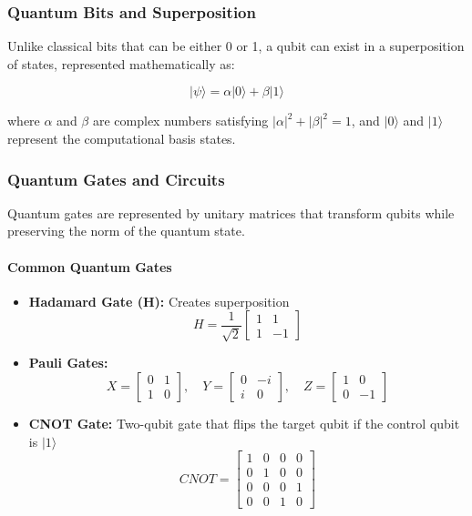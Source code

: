 \documentclass{article}
\begin{document}
\subsubsection{Quantum Bits and Superposition}
Unlike classical bits that can be either 0 or 1, a qubit can exist in a superposition of states, represented mathematically as:

\[ |\psi\rangle = \alpha|0\rangle + \beta|1\rangle \]

where $\alpha$ and $\beta$ are complex numbers satisfying $|\alpha|^2 + |\beta|^2 = 1$, and $|0\rangle$ and $|1\rangle$ represent the computational basis states.

\subsubsection{Quantum Gates and Circuits}
Quantum gates are represented by unitary matrices that transform qubits while preserving the norm of the quantum state.

\paragraph{Common Quantum Gates}
\begin{itemize}
    \item \textbf{Hadamard Gate (H):} Creates superposition
    \[ H = \frac{1}{\sqrt{2}}\begin{bmatrix} 1 & 1 \\ 1 & -1 \end{bmatrix} \]
    
    \item \textbf{Pauli Gates:} 
    \[ X = \begin{bmatrix} 0 & 1 \\ 1 & 0 \end{bmatrix}, \quad 
       Y = \begin{bmatrix} 0 & -i \\ i & 0 \end{bmatrix}, \quad 
       Z = \begin{bmatrix} 1 & 0 \\ 0 & -1 \end{bmatrix} \]
    
    \item \textbf{CNOT Gate:} Two-qubit gate that flips the target qubit if the control qubit is $|1\rangle$
    \[ CNOT = \begin{bmatrix} 1 & 0 & 0 & 0 \\ 0 & 1 & 0 & 0 \\ 0 & 0 & 0 & 1 \\ 0 & 0 & 1 & 0 \end{bmatrix} \]
\end{itemize}
\end{document}
